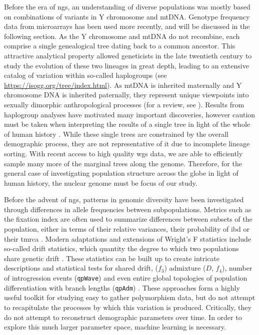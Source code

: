 Before the era of \gls{ngs}, an understanding of diverse populations was mostly based on combinations of variants in Y chromosome and \gls{mtDNA}. Genotype frequency data from microarrays has been used more recently, and will be discussed in the following section. As the Y chromosome and mtDNA do not recombine, each comprise a single genealogical tree dating back to a common ancestor. This attractive analytical property allowed geneticists in the late twentieth century to study the evolution of these two lineages in great depth, leading to an extensive catalog of variation within so-called haplogroups (see \url{https://isogg.org/tree/index.html}). As \gls{mtDNA} is inherited maternally and Y chromosome DNA is inherited paternally, they represent unique viewpoints into sexually dimorphic anthropological processes (for a review, see \textcite{Kivisild2015}). Results from haplogroup analyses have motivated many important discoveries, however caution must be taken when interpreting the results of a single tree in light of the whole of human history \cite{Rubinoff2005}. While these single trees are constrained by the overall demographic process, they are not representative of it due to incomplete lineage sorting. With recent access to high quality \gls{wgs} data, we are able to efficiently sample many more of the marginal trees along the genome. Therefore, for the general case of investigating population structure across the globe in light of human history, the nuclear genome must be focus of our study.

Before the advent of \gls{ngs}, patterns in genomic diversity have been investigated through differences in allele frequencies between subpopulations. 
Metrics such as the fixation index are often used to summarize differences between subsets of the population, either in terms of their relative variances, their probability of \gls{ibd} or their \gls{tmrca} \cite{Holsinger2009}. 
Modern adaptations and extensions of Wright's F statistics include so-called drift statistics, which quantity the degree to which two populations share genetic drift \cite{Patterson2012}. These statistics can be built up to create intricate descriptions and statistical tests for shared drift, ($f_3$) admixture ($D$, $f_4$), number of introgression events ({\tt qpWave}) and even entire global topologies of population differentiation with branch lengths ({\tt qpAdm}) \cite{Petr2019}. These approaches form a highly useful toolkit for studying easy to gather polymorphism data, but do not attempt to recapitulate the processes by which this variation is produced. Critically, they do not attempt to reconstruct demographic parameters over time. In order to explore this much larger parameter space, machine learning is necessary. 

